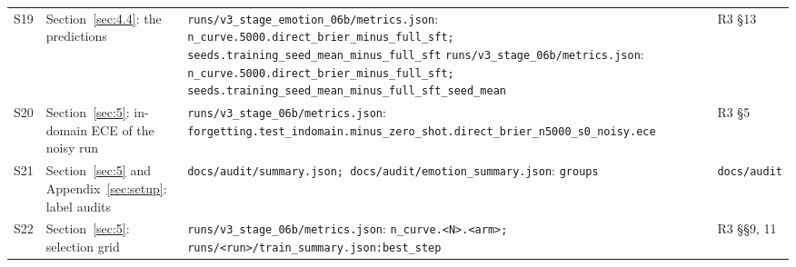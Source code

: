 \documentclass[10pt,letterpaper]{article}
\theoremstyle{plain}
\begin{document}
{\begin{longtable}{@{}p{}>{\raggedright\arraybackslash}p{}>{\raggedright\arraybackslash}p{}>{\raggedright\arraybackslash}p{}@{}}
S19 & Section~\ref{sec:4.4}: the predictions & \texttt{runs/\allowbreak{}v3\_\allowbreak{}stage\_\allowbreak{}emotion\_\allowbreak{}06b/\allowbreak{}metrics.\allowbreak{}json}: \texttt{n\_\allowbreak{}curve.\allowbreak{}5000.\allowbreak{}direct\_\allowbreak{}brier\_\allowbreak{}minus\_\allowbreak{}full\_\allowbreak{}sft;\allowbreak{} seeds.\allowbreak{}training\_\allowbreak{}seed\_\allowbreak{}mean\_\allowbreak{}minus\_\allowbreak{}full\_\allowbreak{}sft} \newline \texttt{runs/\allowbreak{}v3\_\allowbreak{}stage\_\allowbreak{}06b/\allowbreak{}metrics.\allowbreak{}json}: \texttt{n\_\allowbreak{}curve.\allowbreak{}5000.\allowbreak{}direct\_\allowbreak{}brier\_\allowbreak{}minus\_\allowbreak{}full\_\allowbreak{}sft;\allowbreak{} seeds.\allowbreak{}training\_\allowbreak{}seed\_\allowbreak{}mean\_\allowbreak{}minus\_\allowbreak{}full\_\allowbreak{}sft\_\allowbreak{}seed\_\allowbreak{}mean} & R3 \S13 \\
S20 & Section~\ref{sec:5}: in-domain ECE of the noisy run & \texttt{runs/\allowbreak{}v3\_\allowbreak{}stage\_\allowbreak{}06b/\allowbreak{}metrics.\allowbreak{}json}: \texttt{forgetting.\allowbreak{}test\_\allowbreak{}indomain.\allowbreak{}minus\_\allowbreak{}zero\_\allowbreak{}shot.\allowbreak{}direct\_\allowbreak{}brier\_\allowbreak{}n5000\_\allowbreak{}s0\_\allowbreak{}noisy.\allowbreak{}ece} & R3 \S5 \\
S21 & Section~\ref{sec:5} and Appendix~\ref{sec:setup}: label audits & \texttt{docs/\allowbreak{}audit/\allowbreak{}summary.\allowbreak{}json;\allowbreak{} docs/\allowbreak{}audit/\allowbreak{}emotion\_\allowbreak{}summary.\allowbreak{}json}: \texttt{groups} & \texttt{docs/audit} \\
S22 & Section~\ref{sec:5}: selection grid & \texttt{runs/\allowbreak{}v3\_\allowbreak{}stage\_\allowbreak{}06b/\allowbreak{}metrics.\allowbreak{}json}: \texttt{n\_\allowbreak{}curve.\allowbreak{}\textless{}N\textgreater{}.\allowbreak{}\textless{}arm\textgreater{};\allowbreak{} runs/\allowbreak{}\textless{}run\textgreater{}/\allowbreak{}train\_\allowbreak{}summary.\allowbreak{}json:best\_\allowbreak{}step} & R3 \S\S9, 11 \\
\end{longtable}
}
\end{document}
